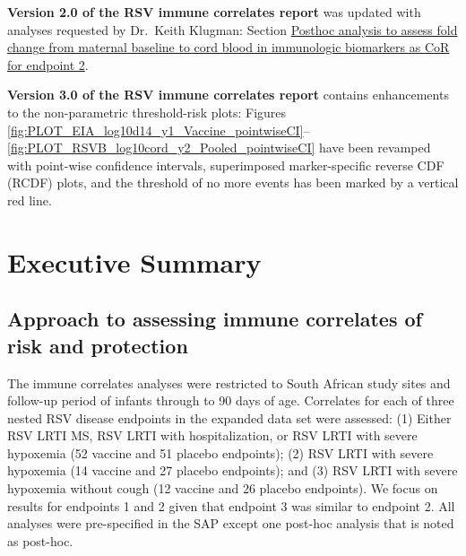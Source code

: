 \documentclass[11pt]{article}
\begin{document}
\listoftables

\newpage
{}
\fancyhead[C]{}

\newcommand{\pathCoRinput}{CoR/input}
\newcommand{\pathThreshinput}{nonparam_threshold/input/y2_Vaccine}
\newcommand{\pathThreshhinput}{nonparam_threshold/input/y1_Vaccine}
\newcommand{\pathThreshpooledinput}{nonparam_threshold/input/y2_Pooled}
\newcommand{\pathThreshhpooledinput}{nonparam_threshold/input/y1_Pooled}

\clearpage

\textbf{Version 2.0 of the RSV immune correlates report} was updated with analyses requested by Dr.~Keith Klugman: Section \protect\hyperlink{posthoc-analysis-to-assess-fold-change-from-maternal-baseline-to-cord-blood-in-immunologic-biomarkers-as-cor-for-endpoint-2}{Posthoc analysis to assess fold change from maternal baseline to cord blood in immunologic biomarkers as CoR for endpoint 2}.

\textbf{Version 3.0 of the RSV immune correlates report} contains enhancements to the non-parametric threshold-risk plots: Figures \ref{fig:PLOT_EIA_log10d14_y1_Vaccine_pointwiseCI}--\ref{fig:PLOT_RSVB_log10cord_y2_Pooled_pointwiseCI} have been revamped with point-wise confidence intervals, superimposed marker-specific reverse CDF (RCDF) plots, and the threshold of no more events has been marked by a vertical red line.

\hypertarget{executive-summary}{%
\section{Executive Summary}\label{executive-summary}}

\hypertarget{approach-to-assessing-immune-correlates-of-risk-and-protection}{%
\subsection{Approach to assessing immune correlates of risk and protection}\label{approach-to-assessing-immune-correlates-of-risk-and-protection}}

The immune correlates analyses were restricted to South African study sites and follow-up period of infants through to 90 days of age.
Correlates for each of three nested RSV disease endpoints in the expanded data set were assessed:
(1) Either RSV LRTI MS, RSV LRTI with hospitalization, or RSV LRTI with severe hypoxemia (52 vaccine and 51 placebo endpoints);
(2) RSV LRTI with severe hypoxemia (14 vaccine and 27 placebo endpoints); and
(3) RSV LRTI with severe hypoxemia without cough (12 vaccine and 26 placebo endpoints). We focus on results for endpoints 1 and 2 given that endpoint 3 was similar to endpoint 2. All analyses were pre-specified in the SAP except one post-hoc analysis that is noted as post-hoc.
\end{document}
